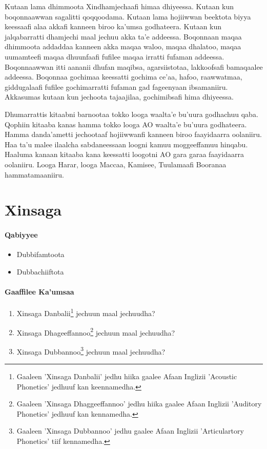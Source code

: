 \documentclass[11pt,b5paper]{book}
\begin{document}
Kutaan lama dhimmoota Xindhamjechaafi himaa dhiyeessa. Kutaan kun boqonnaawwan sagalitti qoqqoodama. Kutaan lama hojiiwwan beektota biyya keessaafi alaa akka\cite{abera1982,temesgen1993,Addunya2018,owens1985grammar,gragg1976oromo,beekamaa1996,griefenow2001grammatical,file2015,baye1988focus,tolemariam2011,Abdusamad1994,aadaa1995}fi kanneen biroo ka’umsa godhateera. Kutaan kun jalqabarratti dhamjechi maal jechuu akka ta’e addeessa. Boqonnaan maqaa dhimmoota addaddaa kanneen akka maqaa waloo, maqaa dhalatoo, maqaa uumamteefi maqaa dhuunfaafi fufilee maqaa irratti fufaman
addeessa. Boqonnaawwan itti aananii dhufan maqibsa, agarsiistotaa, lakkoofsafi bamaqaalee addeessa. Boqonnaa gochimaa keessatti gochima ce’aa, hafoo, raawwatmaa, giddugalaafi fufilee gochimarratti fufaman gad fageenyaan ibsamaniiru. Akkasumas kutaan kun jechoota tajaajilaa, gochimibsafi hima dhiyeessa.


Dhumarrattis kitaabni barnootaa tokko looga waalta’e bu’uura godhachuu qaba. Qophiin kitaaba kanas hamma tokko looga AO waalta’e bu’uura godhateera. Hamma danda’ametti
jechootaaf hojiiwwan\cite{aadaa1995}fi kanneen biroo faayidaarra oolaniiru. Haa ta’u malee ilaalcha sabdaneessaan loogni kamuu moggeeffamuu hinqabu. Haaluma kanaan
kitaaba kana keessatti loogotni AO gara garaa faayidaarra oolaniiru. Looga Harar, looga Maccaa, Kamisee, Tuulamaafi Booranaa hammatamaaniiru\cite{biniyam1988,griefenow2001grammatical,kebede1994}.


\chapter{Xinsaga}
\setlength{\parindent}{3em}
\subsubsection{Qabiyyee}
\begin{itemize}
  \item Dubbifamtoota
  \item Dubbachiiftota
\end{itemize}

\subsubsection{Gaaffilee Ka'umsaa}
\begin{enumerate}
  \item Xinsaga Danbalii\footnote{Gaaleen 'Xinsaga Danbalii' jedhu hiika gaalee Afaan Inglizii 'Acoustic Phonetics' jedhuuf kan keennamedha.} jechuun maal jechuudha?
  \item Xinsaga Dhageeffannoo\footnote{Gaaleen 'Xinsaga Dhaggeeffannoo' jedhu hiika gaalee Afaan Inglizii 'Auditory Phonetics' jedhuuf kan kennamedha.} jechuun maal jechuudha?
  \item Xinsaga Dubbannoo\footnote{Gaaleen 'Xinsaga Dubbannoo' jedhu gaalee Afaan Inglizii 'Articulartory Phonetics' tiif kennamedha.} jechuun maal jechuudha?
\end{enumerate}
\end{document}
